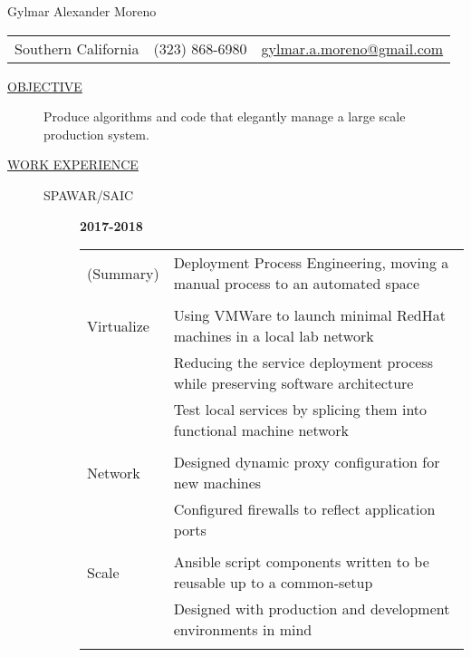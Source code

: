 \documentclass[12pt]{article}
\begin{document}
    \begin{center}
        {\LARGE Gylmar Alexander Moreno}
	\\
        \begin{tabular}{l|l|l}
            Southern California & (323) 868-6980 &
            \href{mailto:gylmar.a.moreno@gmail.com}{gylmar.a.moreno@gmail.com}
        \end{tabular}
    \end{center}

    \begin{description}
        \item[\underline{OBJECTIVE}] Produce algorithms and code that elegantly manage a large scale production system.
            \iffalse Produce algorithms and code that elegantly manage a large scale production system that\fi
        \item[\underline{WORK EXPERIENCE}] \hfill
            \begin{description}
                \item[SPAWAR/SAIC] \hfill \textbf{2017-2018}\\
                    \begin{tabular}{l|l}
			(Summary)  & Deployment Process Engineering, moving a manual process to an automated space\\
				    \\[-1.7mm]
			Virtualize & Using VMWare to launch minimal RedHat machines in a local lab network\\
				   & Reducing the service deployment process while preserving software architecture\\
				   & Test local services by splicing them into functional machine network\\
				    \\[-1.7mm]
			Network	   & Designed dynamic proxy configuration for new machines\\
				   & Configured firewalls to reflect application ports\\
				    \\[-1.7mm]
			Scale	   & Ansible script components written to be reusable up to a common-setup\\
				   & Designed with production and development environments in mind\\
				    \\[-1.7mm]
                    \end{tabular}


\end{description}
\end{description}
\end{document}
